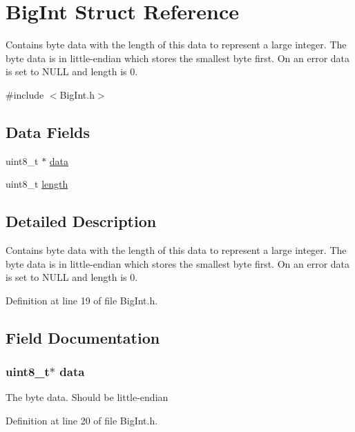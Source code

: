 \hypertarget{struct_big_int}{
\section{BigInt Struct Reference}
\label{struct_big_int}
}


Contains byte data with the length of this data to represent a large integer. The byte data is in little-\/endian which stores the smallest byte first. On an error data is set to NULL and length is 0.  




{\ttfamily \#include $<$BigInt.h$>$}

\subsection*{Data Fields}
\begin{DoxyCompactItemize}
\item 
uint8\_\-t $\ast$ \hyperlink{struct_big_int_abe222f6d3581e7920dcad5306cc906a8}{data}
\item 
uint8\_\-t \hyperlink{struct_big_int_ab2b3adeb2a67e656ff030b56727fd0ac}{length}
\end{DoxyCompactItemize}


\subsection{Detailed Description}
Contains byte data with the length of this data to represent a large integer. The byte data is in little-\/endian which stores the smallest byte first. On an error data is set to NULL and length is 0. 

Definition at line 19 of file BigInt.h.



\subsection{Field Documentation}
\hypertarget{struct_big_int_abe222f6d3581e7920dcad5306cc906a8}{
\subsubsection[{data}]{\setlength{\rightskip}{0pt plus 5cm}uint8\_\-t$\ast$ {\bf data}}}
\label{struct_big_int_abe222f6d3581e7920dcad5306cc906a8}
The byte data. Should be little-\/endian 

Definition at line 20 of file BigInt.h.

